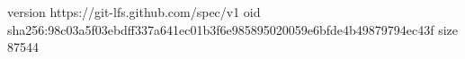 version https://git-lfs.github.com/spec/v1
oid sha256:98c03a5f03ebdff337a641ec01b3f6e985895020059e6bfde4b49879794ec43f
size 87544
